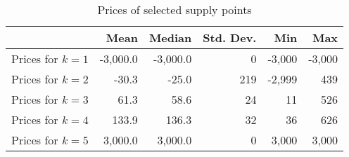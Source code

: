 \begin{table}[H]
\centering
\begin{tabular}{lrrrrr}
 & Mean  & Median  & Std. Dev.  & Min  & Max  \\  \midrule 
Prices for $k=1$ &  -3,000.0 &  -3,000.0 &         0 &    -3,000 &    -3,000 \\  
Prices for $k=2$ &     -30.3 &     -25.0 &       219 &    -2,999 &       439 \\  
Prices for $k=3$ &      61.3 &      58.6 &        24 &        11 &       526 \\  
Prices for $k=4$ &     133.9 &     136.3 &        32 &        36 &       626 \\  
Prices for $k=5$ &   3,000.0 &   3,000.0 &         0 &     3,000 &     3,000 \\  
\bottomrule
\end{tabular}
\caption{\label{selectedPricesSell} Prices of selected supply points}
\end{table}
